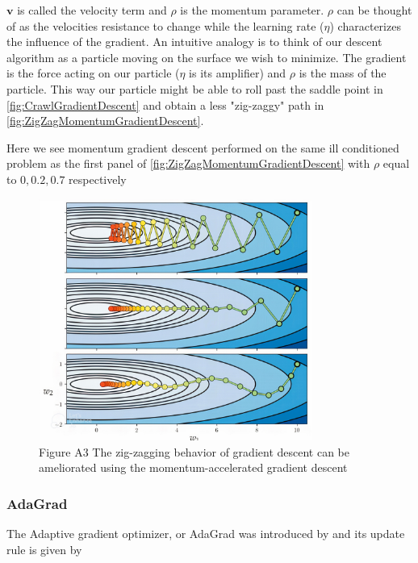 \documentclass{article}
\theoremstyle{definition}
\begin{document}
$\mathbf{v}$ is called the velocity term and $\rho$ is the momentum parameter. $\rho$ can be thought of as the velocities resistance to change while the learning rate ($\eta$) characterizes the influence of the gradient. An intuitive analogy is to think of our descent algorithm as a particle moving on the surface we wish to minimize. The gradient is the force acting on our particle ($\eta$ is its amplifier) and $\rho$ is the mass of the particle. This way our particle might be able to roll past the saddle point in \autoref{fig:CrawlGradientDescent} and obtain a less "zig-zaggy" path in \autoref{fig:ZigZagMomentumGradientDescent}.

\newpage

Here we see momentum gradient descent performed on the same ill conditioned problem as the first panel of \autoref{fig:ZigZagMomentumGradientDescent} with $\rho$ equal to $0, 0.2, 0.7$ respectively

\begin{figure}[H]
    \centering
    \includegraphics[width=0.8\textwidth]{Project2/figures/momentum_based_gradient_descent_less_zig.jpg.jpg}
    \caption{Figure A3 \cite[p.~478]{MLRefined} The zig-zagging behavior of gradient
descent can be ameliorated using the momentum-accelerated gradient descent}
    \label{fig:ZigZagMomentumGradientDescent}
\end{figure}


\subsubsection{AdaGrad}
The Adaptive gradient optimizer, or AdaGrad was introduced by \cite{duchi2011adaptive} and its update rule is given by
\end{document}
